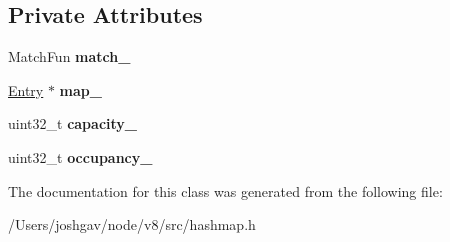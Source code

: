 \subsection*{Private Attributes}
\begin{DoxyCompactItemize}
\item 
Match\+Fun {\bfseries match\+\_\+}\hypertarget{classv8_1_1internal_1_1_template_hash_map_impl_ae81093128a538a947844e3597114105e}{}\label{classv8_1_1internal_1_1_template_hash_map_impl_ae81093128a538a947844e3597114105e}

\item 
\hyperlink{structv8_1_1internal_1_1_template_hash_map_impl_1_1_entry}{Entry} $\ast$ {\bfseries map\+\_\+}\hypertarget{classv8_1_1internal_1_1_template_hash_map_impl_a831b5ac36d313ebdf17d24445697174c}{}\label{classv8_1_1internal_1_1_template_hash_map_impl_a831b5ac36d313ebdf17d24445697174c}

\item 
uint32\+\_\+t {\bfseries capacity\+\_\+}\hypertarget{classv8_1_1internal_1_1_template_hash_map_impl_a50aaf126e4ff5ae92de73b4d3bd2c4ef}{}\label{classv8_1_1internal_1_1_template_hash_map_impl_a50aaf126e4ff5ae92de73b4d3bd2c4ef}

\item 
uint32\+\_\+t {\bfseries occupancy\+\_\+}\hypertarget{classv8_1_1internal_1_1_template_hash_map_impl_a6cd3f4e1bd6f634dcb8ba25ce606c763}{}\label{classv8_1_1internal_1_1_template_hash_map_impl_a6cd3f4e1bd6f634dcb8ba25ce606c763}

\end{DoxyCompactItemize}


The documentation for this class was generated from the following file\+:\begin{DoxyCompactItemize}
\item 
/\+Users/joshgav/node/v8/src/hashmap.\+h\end{DoxyCompactItemize}
